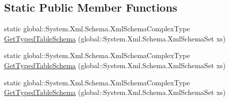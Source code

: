\subsection*{Static Public Member Functions}
\begin{DoxyCompactItemize}
\item 
static global\+::\+System.\+Xml.\+Schema.\+Xml\+Schema\+Complex\+Type \hyperlink{class_env_int_1_1_win32_1_1_field_tech_1_1_manager_1_1_data_sets_1_1_guide_ware_mobile_data_set_e4a98fb4b531becb042ae997c9d8a15c_a26ed2d563b711919ef14929b6e076a0f}{Get\+Typed\+Table\+Schema} (global\+::\+System.\+Xml.\+Schema.\+Xml\+Schema\+Set xs)
\item 
static global\+::\+System.\+Xml.\+Schema.\+Xml\+Schema\+Complex\+Type \hyperlink{class_env_int_1_1_win32_1_1_field_tech_1_1_manager_1_1_data_sets_1_1_guide_ware_mobile_data_set_e4a98fb4b531becb042ae997c9d8a15c_a26ed2d563b711919ef14929b6e076a0f}{Get\+Typed\+Table\+Schema} (global\+::\+System.\+Xml.\+Schema.\+Xml\+Schema\+Set xs)
\item 
static global\+::\+System.\+Xml.\+Schema.\+Xml\+Schema\+Complex\+Type \hyperlink{class_env_int_1_1_win32_1_1_field_tech_1_1_manager_1_1_data_sets_1_1_guide_ware_mobile_data_set_e4a98fb4b531becb042ae997c9d8a15c_a26ed2d563b711919ef14929b6e076a0f}{Get\+Typed\+Table\+Schema} (global\+::\+System.\+Xml.\+Schema.\+Xml\+Schema\+Set xs)
\end{DoxyCompactItemize}
